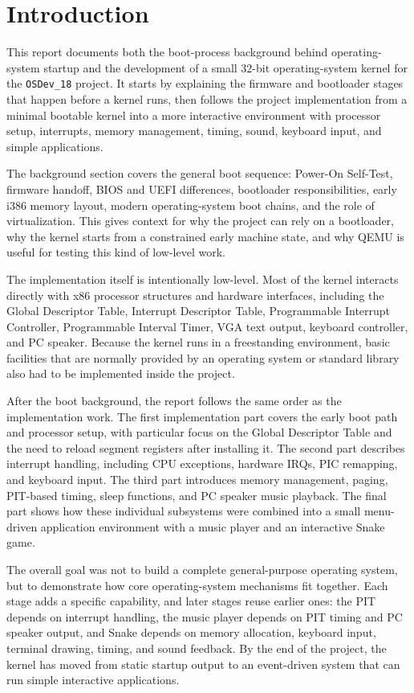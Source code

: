 \section{Introduction}

This report documents both the boot-process background behind operating-system startup and the development of a small 32-bit operating-system kernel for the \texttt{OSDev\_18} project. It starts by explaining the firmware and bootloader stages that happen before a kernel runs, then follows the project implementation from a minimal bootable kernel into a more interactive environment with processor setup, interrupts, memory management, timing, sound, keyboard input, and simple applications.

The background section covers the general boot sequence: Power-On Self-Test, firmware handoff, BIOS and UEFI differences, bootloader responsibilities, early i386 memory layout, modern operating-system boot chains, and the role of virtualization. This gives context for why the project can rely on a bootloader, why the kernel starts from a constrained early machine state, and why QEMU is useful for testing this kind of low-level work.

The implementation itself is intentionally low-level. Most of the kernel interacts directly with x86 processor structures and hardware interfaces, including the Global Descriptor Table, Interrupt Descriptor Table, Programmable Interrupt Controller, Programmable Interval Timer, VGA text output, keyboard controller, and PC speaker. Because the kernel runs in a freestanding environment, basic facilities that are normally provided by an operating system or standard library also had to be implemented inside the project.

After the boot background, the report follows the same order as the implementation work. The first implementation part covers the early boot path and processor setup, with particular focus on the Global Descriptor Table and the need to reload segment registers after installing it. The second part describes interrupt handling, including CPU exceptions, hardware IRQs, PIC remapping, and keyboard input. The third part introduces memory management, paging, PIT-based timing, sleep functions, and PC speaker music playback. The final part shows how these individual subsystems were combined into a small menu-driven application environment with a music player and an interactive Snake game.

The overall goal was not to build a complete general-purpose operating system, but to demonstrate how core operating-system mechanisms fit together. Each stage adds a specific capability, and later stages reuse earlier ones: the PIT depends on interrupt handling, the music player depends on PIT timing and PC speaker output, and Snake depends on memory allocation, keyboard input, terminal drawing, timing, and sound feedback. By the end of the project, the kernel has moved from static startup output to an event-driven system that can run simple interactive applications.
